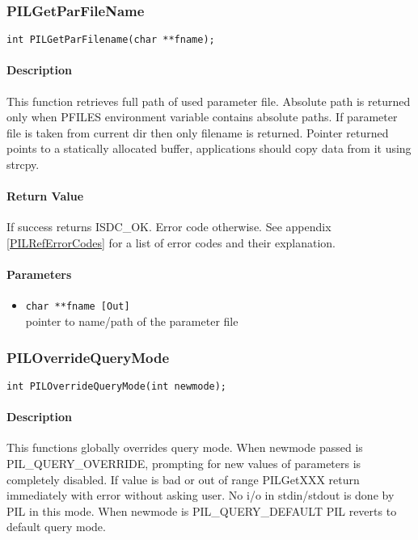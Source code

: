 
\subsubsection{PILGetParFileName}

\begin{verbatim}
int PILGetParFilename(char **fname);
\end{verbatim}

\paragraph{Description\\}
This function retrieves full path of used parameter file. Absolute path is
returned only when
PFILES environment variable contains absolute paths. If parameter file is
taken from
current dir then only filename is returned. Pointer returned points to a
statically allocated
buffer, applications should copy data from it using strcpy. 

\paragraph{Return Value\\}
If success returns ISDC\_OK. Error code otherwise. See appendix \ref{PILRefErrorCodes}
for a list of error codes and their explanation.

\paragraph{Parameters}
\begin{itemize}
\item
{\tt char **fname [Out] } \\
pointer to name/path of the parameter file 
\end{itemize}



\subsubsection{PILOverrideQueryMode}

\begin{verbatim}
int PILOverrideQueryMode(int newmode);
\end{verbatim}

\paragraph{Description\\}
This functions globally overrides query mode. When newmode passed is
PIL\_QUERY\_OVERRIDE, prompting for new values of parameters is completely
disabled. If
value is bad or out of range PILGetXXX return immediately with error without
asking user.
No i/o in stdin/stdout is done by PIL in this mode. When newmode is
PIL\_QUERY\_DEFAULT
PIL reverts to default query mode. 

